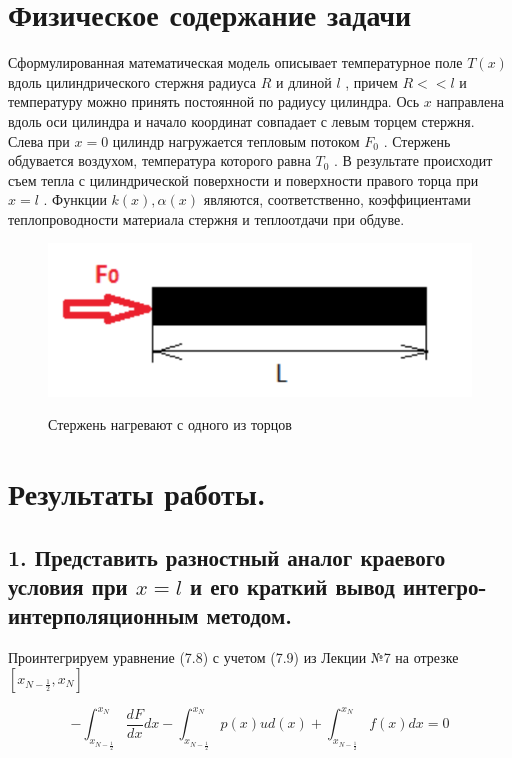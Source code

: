 \documentclass[a4paper,12pt]{article}
\begin{document}
	\section*{Физическое содержание задачи}
	
	Сформулированная математическая модель описывает температурное поле
	$T(x)$
	вдоль цилиндрического стержня радиуса
	$R$
	и длиной
	$l$
	, причем
	$R<<l$
	и температуру
	можно принять постоянной по радиусу цилиндра. Ось
	$x$
	направлена вдоль оси цилиндра и
	начало координат совпадает с левым торцем стержня. Слева при
	$x = 0$
	цилиндр
	нагружается тепловым потоком
	$F_0$
	. Стержень обдувается воздухом, температура которого
	равна
	$T_0$
	. В результате происходит съем тепла с цилиндрической поверхности и
	поверхности правого торца при
	$x = l$ . Функции
	$k(x),\alpha(x)$
	являются, соответственно,
	коэффициентами теплопроводности материала стержня и теплоотдачи при обдуве.
	
	\begin{figure}[h!]
		\begin{center}
			{\includegraphics[scale = 0.7]{stick.png}}
		\end{center}
		\caption{Стержень нагревают с одного из торцов}
		\label{stick}
	\end{figure}
	
	\newpage
	
	\section*{Результаты работы.}
	
	\subsection*{1. Представить разностный аналог краевого условия при $x = l$ и его краткий вывод интегро-интерполяционным методом.}
	
	Проинтегрируем уравнение (7.8) с учетом (7.9) из Лекции №7 на отрезке $[x_{N-\frac{1}{2}}, x_N]$
	
	\[-\int_{x_{N-\frac{1}{2}}}^{x_N}\frac{dF}{dx}dx-\int_{x_{N-\frac{1}{2}}}^{x_N}p(x)u d(x)+\int_{x_{N-\frac{1}{2}}}^{x_N}f(x)dx = 0\]
	
\end{document}
